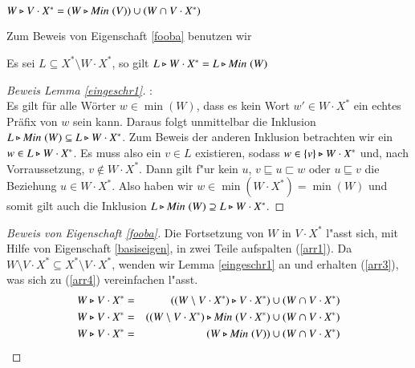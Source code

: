 \begin{eigen}\label{fooba}
$W\triangleright V\cdot X^* = (W\triangleright\mathit{Min}\;(V)) \cup (W\cap V\cdot X^*)$
\end{eigen}
Zum Beweis von Eigenschaft \ref{fooba} benutzen wir

\vspace{2ex}

\begin{lem}\label{eingeschr1}
Es sei $L\subseteq X^*\setminus W\cdot X^*$, so gilt $L\triangleright W\cdot X^* = L\triangleright \mathit{Min}\;(W) $
\end{lem}
\begin{proof}[Beweis Lemma \ref{eingeschr1}]:\\
Es gilt für alle Wörter $w\in\min(W)$, dass es kein Wort $w'\in W\cdot X^*$ ein echtes Präfix von $w$ sein kann.
Daraus folgt unmittelbar die Inklusion $L\triangleright \mathit{Min}\;(W) \subseteq L\triangleright W\cdot X^*$.
Zum Beweis der anderen Inklusion betrachten wir ein $w\in L\triangleright W\cdot X^*$. Es muss also ein $v\in L$ existieren, sodass $w\in \{v\}\triangleright W\cdot X^*$ und, nach Vorraussetzung, $v\notin W\cdot X^*$. Dann gilt f"ur kein $u$, $v\sqsubseteq u\sqsubset w$ oder $u\sqsubseteq v$ die Beziehung $u\in W\cdot X^*$.
Also haben wir $w\in\min(W\cdot X^*) = \min(W)$ und somit gilt auch die Inklusion $L\triangleright \mathit{Min}\;(W) \supseteq L\triangleright W\cdot X^*$.
\end{proof}

\begin{proof}[Beweis von Eigenschaft \ref{fooba}]
Die Fortsetzung von $W$ in $V\cdot X^*$ l"asst sich, mit Hilfe von Eigenschaft \ref{basiseigen}, in zwei Teile aufspalten (\ref{arr1}).
Da $W\setminus V\cdot X^* \subseteq X^*\setminus V\cdot X^*$, wenden wir Lemma \ref{eingeschr1} an und erhalten (\ref{arr3}), was sich zu (\ref{arr4}) vereinfachen l"asst.
\setcounter{equation}{0}
\begin{eqnarray}
W\triangleright V\cdot X^* & = & ((W\setminus V\cdot X^*) \triangleright V\cdot X^*) \cup (W\cap V\cdot X^*) \label{arr1}\\
W\triangleright V\cdot X^* & = & ((W\setminus V\cdot X^*)  \triangleright \mathit{Min}\;(V\cdot X^*) \cup (W\cap V\cdot X^*) \label{arr3} \\
W\triangleright V\cdot X^* & = &(W \triangleright \mathit{Min}\;(V)) \cup (W\cap V\cdot X^*) \label{arr4}
\end{eqnarray}
\end{proof}






